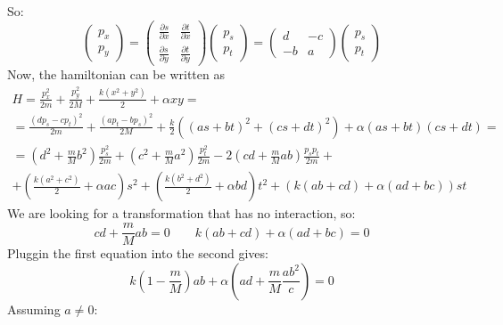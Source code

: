 \documentclass{article}
\begin{document}
So:
\begin{equation}
    \begin{pmatrix}
        p_x \\ p_y
    \end{pmatrix} = \begin{pmatrix}
        \frac{\partial s}{\partial x} & \frac{\partial t}{\partial x} \\ \frac{\partial s}{\partial y} & \frac{\partial t}{\partial y}
    \end{pmatrix} \begin{pmatrix}
        p_s \\ p_t
    \end{pmatrix} = \begin{pmatrix}
        d & -c \\ -b & a
    \end{pmatrix} \begin{pmatrix}
        p_s \\ p_t
    \end{pmatrix}
\end{equation}
Now, the hamiltonian can be written as
\begin{equation}
\begin{gathered}
    H = \frac{p_x^2}{2m} + \frac{p_y^2}{2M} + \frac{k\left(x^2 + y^2\right)}{2} + \alpha xy = \\ =
    \frac{(dp_s - cp_t)^2}{2m} + \frac{(ap_t - b p_s)^2}{2M} + \frac{k}{2}\left((as + bt)^2 + (cs + dt)^2\right) + \alpha(as + bt)(cs + dt) = \\ =
    \left(d^2 + \frac{m}{M}b^2\right)\frac{p_s^2}{2m}
    + \left(c^2 + \frac{m}{M}a^2\right)\frac{p_t^2}{2m}
    - 2\left(cd + \frac{m}{M}ab\right)\frac{p_s p_t}{2m}
    + \\ + \left(\frac{k(a^2 + c^2)}{2} + \alpha a c\right)s^2
    + \left(\frac{k(b^2 + d^2)}{2} + \alpha bd\right)t^2
    + \left(k(ab + cd) + \alpha (ad + bc)\right)st
\end{gathered}
\end{equation}
We are looking for a transformation that has no interaction, so:
\begin{equation}
    cd + \frac{m}{M}ab = 0
    \qquad
    k(ab + cd) + \alpha (ad + bc) = 0
\end{equation}
Pluggin the first equation into the second gives:
\begin{equation}
    k\left(1 - \frac{m}{M}\right)ab + \alpha \left(ad + \frac{m}{M}\frac{ab^2}{c}\right) = 0
\end{equation}
Assuming $a \ne 0$:
\end{document}
